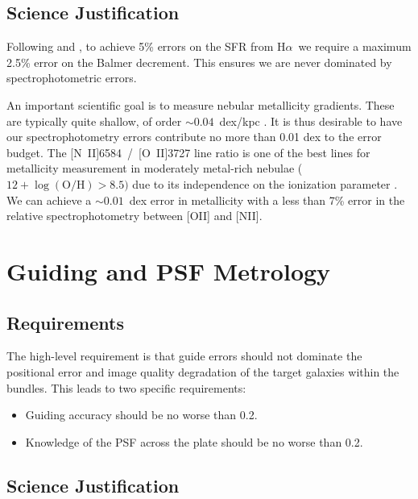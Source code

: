 \documentclass[preprint,11pt]{aastex}
\newcommand{\Halpha}{{H$\alpha$}}
\begin{document}
\subsection{Science Justification}

Following \citet{kennicutt1998} and \citet{calzetti01}, to achieve 5\%
errors on the SFR from \Halpha\ we require a maximum 2.5\% error on the Balmer
decrement. This ensures we are never dominated by spectrophotometric
errors.

An important scientific goal is to measure nebular metallicity
gradients. These are typically quite shallow, of order
$\sim0.04$~dex/kpc \citep{vanzee1996}. It is thus desirable to
have our spectrophotometry errors contribute no more than 0.01 dex to
the error budget. The [N~II]6584~/~[O~II]3727 line ratio is one of the
best lines for metallicity measurement in moderately metal-rich
nebulae ($12 + \log(\mathrm{O/H}) > 8.5)$ due to its independence on
the ionization parameter \citep{kewley02}. We can achieve a
$\sim0.01$~dex error in metallicity with a less than 7\% error in the relative
spectrophotometry between [OII] and [NII].

\section{Guiding and PSF Metrology} \label{sec:guiding}

\subsection{Requirements}

The high-level requirement is that guide errors should not dominate
the positional error and image quality degradation of the target
galaxies within the bundles. This leads to two specific requirements:

\begin{itemize}
\item Guiding accuracy should be no worse than 0.2\arcsec.
\item Knowledge of the PSF across the plate should be no worse than 0.2\arcsec.
\end{itemize}

\subsection{Science Justification}
\end{document}
